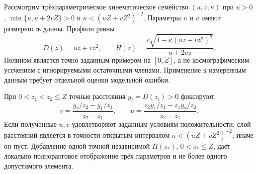 \section{}\label{sec:finite}
{Рассмотрим трёхпараметрическое кинематическое семейство $(u,v,\kappa)$ при $u>0$, $\min\{u,u+2vZ\}>0$ и $\kappa<(uZ+vZ^2)^{-2}$. Параметры $u$ и $v$ имеют размерность длины. Профили равны}
\begin{equation}\label{eq:polynomial}
 D(z)=uz+vz^2,\qquad
 H(z)=\frac{c\sqrt{1-\kappa(uz+vz^2)^2}}{u+2vz}.
\end{equation}
{Полином является точно заданным примером на $[0,Z]$, а не космографическим усечением с игнорируемыми остаточными членами. Применение к измеренным данным требует отдельной оценки модельной ошибки.}
\begin{theorem}\label{thm:finite}
{При $0<z_1<z_2\leq Z$ точные расстояния $y_i=D(z_i)>0$ фиксируют}
\begin{equation}\label{eq:inversion}
 v=\frac{y_2/z_2-y_1/z_1}{z_2-z_1},\qquad
 u=\frac{z_2y_1/z_1-z_1y_2/z_2}{z_2-z_1}.
\end{equation}
{Если полученные $u,v$ удовлетворяют заданным условиям положительности, слой расстояний является в точности открытым интервалом $\kappa<(uZ+vZ^2)^{-2}$; иначе он пуст. Добавление одной точной независимой $H(z_*)$, $0<z_*\leq Z$, даёт локально полноранговое отображение трёх параметров и не более одного допустимого элемента.}
\end{theorem}
